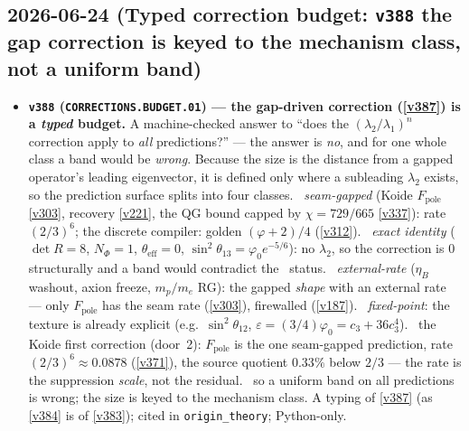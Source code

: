 \subsection*{2026-06-24 (Typed correction budget: \texttt{v388} the gap correction is keyed to the mechanism class, not a uniform band)}
\begin{itemize}
\item \textbf{\texttt{v388} (\texttt{CORRECTIONS.BUDGET.01}) --- the gap-driven correction (\vref{v387}) is a \emph{typed} budget.}
A machine-checked answer to ``does the $(\lambda_2/\lambda_1)^n$ correction apply to \emph{all} predictions?'' --- the
answer is \emph{no}, and for one whole class a band would be \emph{wrong}. Because the size is the distance from a
gapped operator's leading eigenvector, it is defined only where a subleading $\lambda_2$ exists, so the prediction
surface splits into four classes. \mE\ \emph{seam-gapped} (Koide $F_{\mathrm{pole}}$ \vref{v303}, recovery \vref{v221},
the QG bound capped by $\chi=729/665$ \vref{v337}): rate $(2/3)^6$; the discrete compiler: golden $(\varphi+2)/4$
(\vref{v312}). \mE\ \emph{exact identity} ($\det R=8$, $N_\Phi=1$, $\theta_{\mathrm{eff}}=0$, $\sin^2\theta_{13}=\varphi_0
e^{-5/6}$): no $\lambda_2$, so the correction is $0$ structurally and a band would contradict the \mE\ status. \mE\
\emph{external-rate} ($\eta_B$ washout, axion freeze, $m_p/m_e$ RG): the gapped \emph{shape} with an external rate ---
only $F_{\mathrm{pole}}$ has the seam rate (\vref{v303}), firewalled (\vref{v187}). \mE\ \emph{fixed-point}: the texture
is already explicit (e.g.\ $\sin^2\theta_{12}$, $\varepsilon=(3/4)\varphi_0=c_3+36c_3^4$). \mE\ the Koide first correction
(door~2): $F_{\mathrm{pole}}$ is the one seam-gapped prediction, rate $(2/3)^6\approx0.0878$ (\vref{v371}), the source
quotient $0.33\%$ below $2/3$ --- the rate is the suppression \emph{scale}, not the residual. \mC\ so a uniform band on
all predictions is wrong; the size is keyed to the mechanism class. A typing of \vref{v387} (as \vref{v384} is of
\vref{v383}); cited in \texttt{origin\_theory}; Python-only.
\end{itemize}

